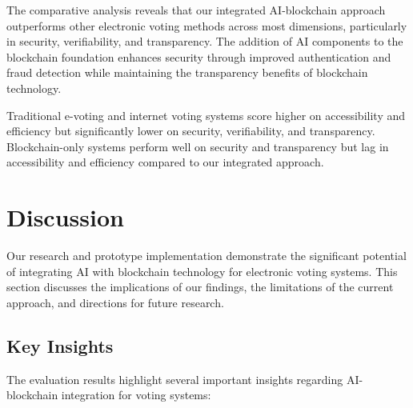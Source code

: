 \documentclass[conference]{IEEEtran}
\begin{document}
The comparative analysis reveals that our integrated AI-blockchain approach outperforms other electronic voting methods across most dimensions, particularly in security, verifiability, and transparency. The addition of AI components to the blockchain foundation enhances security through improved authentication and fraud detection while maintaining the transparency benefits of blockchain technology.

Traditional e-voting and internet voting systems score higher on accessibility and efficiency but significantly lower on security, verifiability, and transparency. Blockchain-only systems perform well on security and transparency but lag in accessibility and efficiency compared to our integrated approach.

\section{Discussion}
Our research and prototype implementation demonstrate the significant potential of integrating AI with blockchain technology for electronic voting systems. This section discusses the implications of our findings, the limitations of the current approach, and directions for future research.

\subsection{Key Insights}
The evaluation results highlight several important insights regarding AI-blockchain integration for voting systems:
\end{document}
